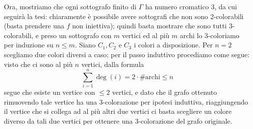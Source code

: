 \documentclass[a4paper]{article}
\theoremstyle{definition}
\theoremstyle{definition}
\theoremstyle{remark}
\theoremstyle{definition}
\begin{document}
Ora, mostriamo che ogni sottografo finito di $\Gamma$ ha numero cromatico $3$, da cui seguirà la tesi: chiaramente è possibile avere sottografi che non sono 2-colorabili (basta
prendere una $f$ non iniettiva); quindi basta mostrare
che sono tutti 3-colorabili, e preso un sottografo con $m$ vertici ed al più $m$ archi lo 3-coloriamo per induzione su $n\leq m$. Siano $C_1, C_2$ e $C_3$ i colori a disposizione. Per $n=2$ scegliamo
due colori diversi a caso; per il
passo induttivo procediamo come segue: visto che ci sono al più $n$ vertici, dalla formula $$ \sum_{i=1}^n{\operatorname{deg}(i)}=2\cdot\text{\# archi}\leq n$$ segue che esiste un
vertice con $\leq 2$ vertici, e dato che il grafo ottenuto rimuovendo tale vertice ha una 3-colorazione per ipotesi induttiva, riaggiungendo il vertice che si collega ad al più
altri due vertici ci basta scegliere un colore diverso da tali due vertici per ottenere una 3-colorazione del grafo originale.
\setcounter{exercise}{35}
\end{document}
